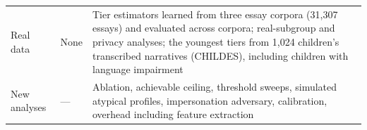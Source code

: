 \begin{table}[tbp]
\begin{tabularx}{\textwidth}{>{\raggedright\arraybackslash}p{2.3cm}LL}
Real data & None & Tier estimators learned from three essay corpora (31{,}307 essays) and evaluated across corpora; real-subgroup and privacy analyses; the youngest tiers from 1{,}024 children's transcribed narratives (CHILDES), including children with language impairment \\
New analyses & --- & Ablation, achievable ceiling, threshold sweeps, simulated atypical profiles, impersonation adversary, calibration, overhead including feature extraction \\
\bottomrule
\end{tabularx}
\end{table}
